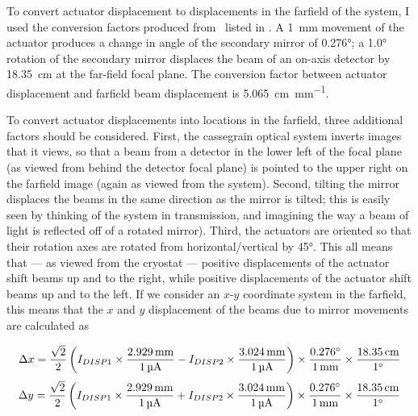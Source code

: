 To convert actuator displacement to displacements in the farfield of the system, I used the conversion factors produced from \ZEMAX\ listed in .
A \SI{1}{\mm} movement of the actuator produces a change in angle of the secondary mirror of \ang{0.276}; a \ang{1.0} rotation of the secondary mirror displaces the beam of an on-axis detector by \SI{18.35}{\cm} at the far-field focal plane.
The conversion factor between actuator displacement and farfield beam displacement is \SI{5.065}{\cm\per\mm}.

To convert actuator displacements into locations in the farfield, three additional factors should be considered.
First, the cassegrain optical system inverts images that it views, so that a beam from a detector in the lower left of the focal plane (as viewed from behind the detector focal plane) is pointed to the upper right on the farfield image (again as viewed from the system).
Second, tilting the mirror displaces the beams in the same direction as the mirror is tilted; this is easily seen by thinking of the system in transmission, and imagining the way a beam of light is reflected off of a rotated mirror).
Third, the actuators are oriented so that their rotation axes are rotated from horizontal/vertical by \ang{45}.
This all means that --- as viewed from the cryostat --- positive displacements of the  actuator shift beams up and to the right, while positive displacements of the  actuator shift beams up and to the left.
If we consider an $x$-$y$ coordinate system in the farfield, this means that the $x$ and $y$ displacement of the beams due to mirror movements are calculated as

\begin{equation}
\Delta x = \frac{\sqrt{2}}{2} \left( I_{\DISP1} \times \frac{\SI{2.929}{\mm}}{\SI{1}{\uA}} -
                              I_{\DISP2} \times \frac{\SI{3.024}{\mm}}{\SI{1}{\uA}}  \right) \times
    \frac{\ang{0.276}} {\SI{1}{\mm}} \times
    \frac{\SI{18.35}{\cm}} {\ang{1}}
\end{equation}
\begin{equation}
\Delta y = \frac{\sqrt{2}}{2} \left( I_{\DISP1} \times \frac{\SI{2.929}{\mm}}{\SI{1}{\uA}} +
                              I_{\DISP2} \times \frac{\SI{3.024}{\mm}}{\SI{1}{\uA}}  \right) \times
    \frac{\ang{0.276}} {\SI{1}{\mm}} \times
    \frac{\SI{18.35}{\cm}} {\ang{1}}
\end{equation}




